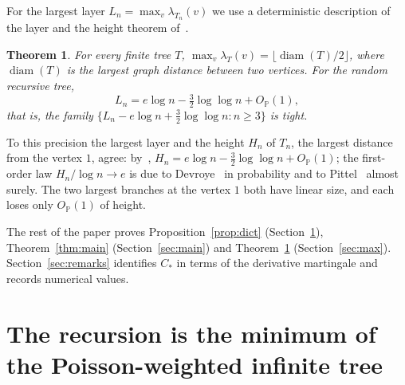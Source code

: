 \documentclass[11pt]{amsart}
\newtheorem{theorem}{Theorem}[section]
\theoremstyle{definition}
\theoremstyle{remark}
\numberwithin{equation}{section}
\newcommand{\PP}{\mathbb P}
\newcommand{\diam}{\operatorname{diam}}
\begin{document}
For the largest layer $L_n=\max_v\lambda_{T_n}(v)$ we use a deterministic description of the layer and the height theorem of~\cite{ABF}.

\begin{theorem}\label{thm:maxlayer}
For every finite tree $T$, $\max_v\lambda_T(v)=\lfloor\diam(T)/2\rfloor$, where $\diam(T)$ is the largest graph distance between two vertices. For the random recursive tree,
\[
L_n=e\log n-\tfrac32\log\log n+O_\PP(1),
\]
that is, the family $\{L_n-e\log n+\tfrac32\log\log n:n\ge3\}$ is tight.
\end{theorem}

To this precision the largest layer and the height $H_n$ of $T_n$, the largest distance from the vertex $1$, agree: by~\cite[Corollary~1.3]{ABF}, $H_n=e\log n-\tfrac32\log\log n+O_\PP(1)$; the first-order law $H_n/\log n\to e$ is due to Devroye~\cite{Dev} in probability and to Pittel~\cite{Pit} almost surely. The two largest branches at the vertex $1$ both have linear size, and each loses only $O_\PP(1)$ of height.

The rest of the paper proves Proposition~\ref{prop:dict} (Section~\ref{sec:dict}), Theorem~\ref{thm:main} (Section~\ref{sec:main}) and Theorem~\ref{thm:maxlayer} (Section~\ref{sec:max}). Section~\ref{sec:remarks} identifies $C_*$ in terms of the derivative martingale and records numerical values.

\section{The recursion is the minimum of the Poisson-weighted infinite tree}\label{sec:dict}
\end{document}
